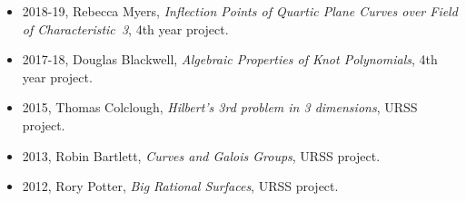 \begin{itemize}
\vspace{-\smallskipamount}
\item
2018-19, Rebecca Myers, {\emph{Inflection Points of Quartic Plane Curves over Field of Characteristic~3}}, 4th year project.
\vspace{-\smallskipamount}
\item
2017-18, Douglas Blackwell, {\emph{Algebraic Properties of Knot Polynomials}}, 4th year project.
\vspace{-\smallskipamount}
\item
2015, Thomas Colclough, {\emph{Hilbert's 3rd problem in 3 dimensions}}, URSS project.
\vspace{-\smallskipamount}
\item
2013, Robin Bartlett, {\emph{Curves and Galois Groups}}, URSS project.
\vspace{-\smallskipamount}
\item
2012, Rory Potter, {\emph{Big Rational Surfaces}}, URSS project.
\end{itemize}

